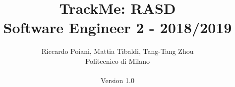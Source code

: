 \documentclass[a4paper]{article}
\begin{document}
\title{TrackMe: RASD \\Software Engineer 2 - 2018/2019}
\author{
        Riccardo Poiani, Mattia Tibaldi, Tang-Tang Zhou \\
        Politecnico di Milano\\\\ 
        Version 1.0
}
\maketitle
\newpage
\tableofcontents
\newpage



\newpage



\newpage



\newpage



\newpage



\newpage
\end{document}

